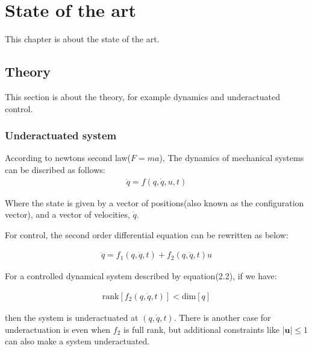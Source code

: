 \chapter{State of the art}
This chapter is about the state of the art.

\section{Theory}
This section is about the theory, for example dynamics and underactuated control.

\subsection{Underactuated system}
According to newtons second law(\( F = ma \)), The dynamics of mechanical systems can be discribed as follows:
\begin{align}
    \ddot{q} = f(q, \dot{q}, u, t)
\end{align}

Where the state is given by a vector of positions(also known as the configuration vector), and a vector of velocities, \( \dot{q}\).

For control, the second order differential equation can be rewritten as below:

\begin{align}
    \ddot{q} = f_1(q, \dot{q}, t) + f_2(q, \dot{q}, t)u
\end{align}

For a controlled dynamical system described by equation(2.2), if we have:

\begin{align}
    \text{rank}[f_2(q, \dot{q}, t)] < \text{dim}[q]
\end{align}

then the system is underactuated at \((q, \dot{q}, t)\). There is another case for underactuation is even when \(f_2\) is full rank, but additional constraints like \(|\mathbf{u}| \leq 1\) can also make a system underactuated.


